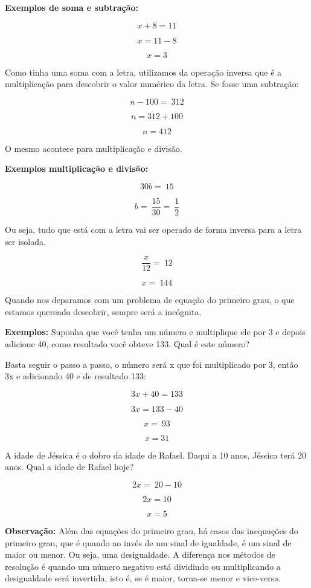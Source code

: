 \textbf{Exemplos de soma e subtração:}

\[x + 8 = 11\]

\[x = 11 - 8\]

\[x = 3\]

Como tinha uma soma com a letra, utilizamos da operação inversa que é a
multiplicação para descobrir o valor numérico da letra. Se fosse uma
subtração:

\[n - 100 = \ 312\]

\[n = 312 + 100\]

\[n = 412\]

O mesmo acontece para multiplicação e divisão.

\textbf{Exemplos multiplicação e divisão:}

\[30b = \ 15\]

\[b = \ \frac{15}{30} = \ \frac{1}{2}\]

Ou seja, tudo que está com a letra vai ser operado de forma inversa para
a letra ser isolada.

\[\frac{x}{12} = \ 12\]

\[x = \ 144\]

Quando nos deparamos com um problema de equação do primeiro grau, o que
estamos querendo descobrir, sempre será a incógnita.

\textbf{Exemplos:} Suponha que você tenha um número e multiplique ele
por 3 e depois adicione 40, como resultado você obteve 133. Qual é este
número?

Basta seguir o passo a passo, o número será x que foi multiplicado por
3, então 3x e adicionado 40 e de resultado 133:

\[3x + 40 = 133\]

\[3x = 133 - 40\]

\[x = \ 93\]

\[x = 31\]

A idade de Jéssica é o dobro da idade de Rafael. Daqui a 10 anos,
Jéssica terá 20 anos. Qual a idade de Rafael hoje?

\[2x = \ 20 - 10\]

\[2x = 10\]

\[x = 5\]

\textbf{Observação:} Além das equações do primeiro grau, há casos das
inequações do primeiro grau, que é quando ao invés de um sinal de
igualdade, é um sinal de maior ou menor. Ou seja, uma desigualdade. A
diferença nos métodos de resolução é quando um número negativo está
dividindo ou multiplicando a desigualdade será invertida, isto é, se é
maior, torna-se menor e vice-versa.

